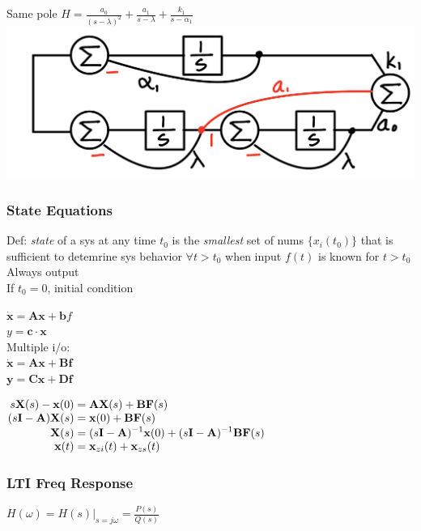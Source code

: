 \documentclass[4pt]{article}
\theoremstyle{definition}
\theoremstyle{definition}
\renewcommand{\o}{\omega}
\begin{document}
\begin{landscape}
\begin{multicols}{3}
    Same pole                           %
    \(H = \frac{a_0}{(s-\lambda)^2} + \frac{a_1}{s-\lambda} + \frac{k_1}{s-\alpha_1}\)      %
    \includegraphics[width=0.7\linewidth]{figures/multipole.jpg}

\columnbreak
\subsubsection*{State Equations}
    Def: \textit{state} of a sys at any time $t_0$ is the \textit{smallest} set of nums $\{x_i(t_0)\}$
        that is sufficient to detemrine sys behavior $\forall t > t_0$ 
        when input $f(t)$ is known for $t > t_0$\\
    Always \fbox{$\int$} output\\
    If $t_0 = 0$, initial condition


    \(\mathbf{\dot x} = \mathbf A \mathbf x + \mathbf b f\)\\
    \(y = \mathbf{c} \cdot \mathbf x\)\\
    Multiple i/o:\\
    \(\mathbf{\dot x} = \mathbf A \mathbf x + \mathbf B \mathbf f\)\\
    \(\mathbf y = \mathbf C \mathbf x + \mathbf D \mathbf f\)

    \(
        \setlength{\jot}{0pt} %
        \begin{aligned}
            s \mathbf X(s) - \mathbf x(0) &= \mathbf A \mathbf X(s) + \mathbf B \mathbf F(s) \\
            (s \mathbf I - \mathbf A) \mathbf X(s) &= \mathbf x(0) + \mathbf B \mathbf F(s) \\
            \mathbf X(s) &= (s \mathbf I - \mathbf A)^{-1} \mathbf x(0) + (s \mathbf I - \mathbf A)^{-1} \mathbf B \mathbf F(s)\\
            \mathbf x(t) &= \mathbf x_{zi}(t) + \mathbf x_{zs}(t)
        \end{aligned}
    \)
\subsubsection*{LTI Freq Response}
    \(H(\o) = H(s)|_{s = j\o} = \frac{P(s)}{Q(s)}\)     %


\end{multicols}
\end{landscape}
\end{document}
